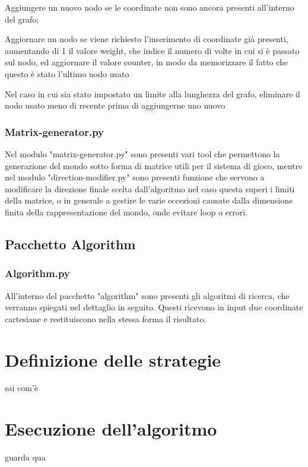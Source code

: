 Aggiungere un nuovo nodo se le coordinate non sono ancora presenti all'interno del grafo;

Aggiornare un nodo se viene richiesto l'inserimento di coordinate già presenti, aumentando di 1 il valore weight, che indice il numero di volte in cui si è passato sul nodo, ed aggiornare il valore counter, in modo da memorizzare il fatto che questo è stato l'ultimo nodo usato

Nel caso in cui sia stato impostato un limite alla lunghezza del grafo, eliminare il nodo usato meno di recente prima di aggiungerne uno nuovo
\subsubsection{Matrix-generator.py}
Nel modulo "matrix-generator.py" sono presenti vari tool che permettono la generazione del mondo sotto forma di matrice utili per il sistema di gioco, mentre nel modulo "direction-modifier.py" sono presenti funzione che servono a modificare la direzione finale scelta dall'algoritmo nel caso questa superi i limiti della matrice, o in generale a gestire le varie eccezioni causate dalla dimensione finita della rappresentazione del mondo, onde evitare loop o errori. 
\subsection{Pacchetto Algorithm}
\subsubsection{Algorithm.py}
All'interno del pacchetto "algorithm" sono presenti gli algoritmi di ricerca, che verranno spiegati nel dettaglio in seguito. Questi ricevono in input due coordinate cartesiane e restituiscono nella stessa forma il risultato.


	
\section{Definizione delle strategie}
	sai com'è
	
\section{Esecuzione dell'algoritmo}
	guarda qua
